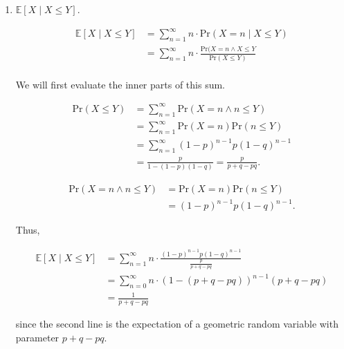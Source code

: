 \documentclass[letterpaper, 12pt]{article}
\begin{document}
\begin{enumerate}
		\item $\mathbb{E}[X \mid X\leq Y]$.

			\begin{align*}
				\mathbb{E}[X\mid X\leq Y] &= \sum_{n=1}^{\infty}n\cdot\text{Pr}(X=n\mid X\leq Y) \\
                &= \sum_{n=1}^\infty n \cdot \frac{\text{Pr}(X=n \land X\leq Y}{\text{Pr}(X\leq Y)} \\
			\end{align*}
			
			We will first evaluate the inner parts of this sum.

			\begin{align*}
				\text{Pr}(X\leq Y) &= \sum_{n=1}^{\infty} \text{Pr}(X=n \land n\leq Y) \\
				&= \sum_{n=1}^\infty \text{Pr}(X=n)\text{Pr}(n\leq Y) \\
				&= \sum_{n=1}^\infty (1-p)^{n-1}p(1-q)^{n-1} \\
				&= \frac{p}{1 - (1-p)(1-q)} = \frac{p}{p + q - pq}.
			\end{align*}

			\begin{align*}
				\text{Pr}(X=n \land n\leq Y) &= \text{Pr}(X=n)\text{Pr}(n\leq Y) \\
				&= (1-p)^{n-1}p(1-q)^{n-1}.
			\end{align*}

			Thus,

			\begin{align*}
				\mathbb{E}[X\mid X\leq Y] &= \sum_{n=1}^{\infty}n\cdot\frac{(1-p)^{n-1}p(1-q)^{n-1}}{\frac{p}{p + q - pq}} \\
				&= \sum_{n=0}^\infty n\cdot (1-(p + q - pq))^{n-1}(p+q-pq) \\
				&= \frac{1}{p + q - pq}
			\end{align*}

			since the second line is the expectation of a geometric random variable with parameter $p+q-pq$.
	\end{enumerate}
\end{document}
